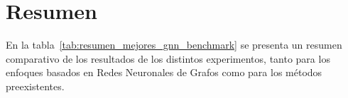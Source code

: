 











\section{Resumen}

En la tabla~\ref{tab:resumen_mejores_gnn_benchmark} se presenta un resumen comparativo de los resultados de los distintos experimentos, tanto para los enfoques basados en Redes Neuronales de Grafos como para los métodos preexistentes.\\


